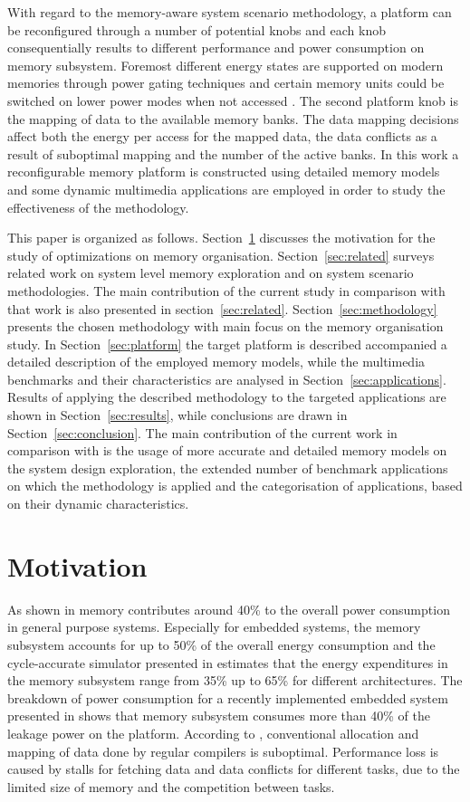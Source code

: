 \documentclass[a4paper,conference]{IEEEtran}
\begin{document}
With regard to the memory-aware system scenario methodology, a platform can be reconfigured through a number of potential knobs and each knob consequentially results to different performance and power consumption on memory subsystem. Foremost different energy states are supported on modern memories through power gating techniques and certain memory units could be switched on lower power modes when not accessed \cite{Fil12}. The second platform knob is the mapping of data to the available memory banks. The data mapping decisions affect both the energy per access for the mapped data, the data conflicts as a result of suboptimal mapping and the number of the active banks. In this work a reconfigurable memory platform is constructed using detailed memory models and some dynamic multimedia applications are employed in order to study the effectiveness of the methodology.

This paper is organized as follows. Section~\ref{sec:motivation} discusses the motivation for the study of optimizations on memory organisation. Section~\ref{sec:related} surveys related work on system level memory exploration and on system scenario methodologies. The main contribution of the current study in comparison with that work is also presented in section~\ref{sec:related}. Section~\ref{sec:methodology} presents the chosen methodology with main focus on the memory organisation study. In Section~\ref{sec:platform} the target platform is described accompanied a detailed description of the employed memory models, while the multimedia benchmarks and their characteristics are analysed in Section~\ref{sec:applications}. Results of applying the described methodology to the targeted applications are shown in Section~\ref{sec:results}, while conclusions are drawn in Section~\ref{sec:conclusion}. The main contribution of the current work in comparison with \cite{Fil12} is the usage of more accurate and detailed memory models on the system design exploration, the extended number of benchmark applications on which the methodology is applied and the categorisation of applications, based on their dynamic characteristics.

\section{Motivation}
\label{sec:motivation}

As shown in \cite{Gonzalez1996} memory contributes around 40\% to the overall power consumption in general purpose systems. Especially for embedded systems, the memory subsystem accounts for up to 50\% of the overall energy consumption \cite{Che09} and the cycle-accurate simulator presented in \cite{Ben99} estimates that the energy expenditures in the memory subsystem range from 35\% up to 65\% for different architectures. The breakdown of power consumption for a recently implemented embedded system presented in \cite{Hul11} shows that memory subsystem consumes more than 40\% of the leakage power on the platform. According to \cite{tcm}, conventional allocation and mapping of data done by regular compilers is suboptimal. Performance loss is caused by stalls for fetching data and data conflicts for different tasks, due to the limited size of memory and the competition between tasks. 
\end{document}
